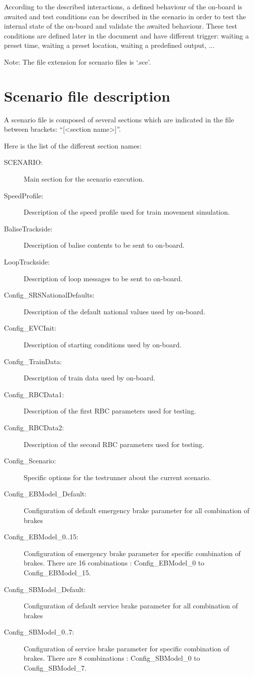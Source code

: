 According to the described interactions, a defined behaviour of the on-board is awaited and test conditions can be described in the scenario in order to test the internal state of the on-board and validate the awaited behaviour. These test conditions are defined later in the document and have different trigger: waiting a preset time, waiting a preset location, waiting a predefined output, ...

Note: The file extension for scenario files is ‘.sce’.

\section{Scenario file description}

A scenario file is composed of several sections which are indicated in the file between brackets: “[<section name>]”.

Here is the list of the different section names:

\begin{description}
	\item[SCENARIO:] Main section for the scenario execution.
	\item[SpeedProfile:] Description of the speed profile used for train movement simulation.
	\item[BaliseTrackside:] Description of balise contents to be sent to on-board.
	\item[LoopTrackside:] Description of loop messages to be sent to on-board.
	\item[Config\_SRSNationalDefaults:] Description of the default national values used by on-board.
	\item[Config\_EVCInit:] Description of starting conditions used by on-board.
	\item[Config\_TrainData:] Description of train data used by on-board.
	\item[Config\_RBCData1:] Description of the first RBC parameters used for testing.
	\item[Config\_RBCData2:] Description of the second RBC parameters used for testing.
	\item[Config\_Scenario:] Specific options for the testrunner about the current scenario.
    \item[Config\_EBModel\_Default:] Configuration of default emergency brake parameter for all combination of brakes
    \item[Config\_EBModel\_0..15:] Configuration of emergency brake parameter for specific combination of brakes. There are 16 combinations : Config\_EBModel\_0 to Config\_EBModel\_15.
    \item[Config\_SBModel\_Default:] Configuration of default service brake parameter for all combination of brakes
    \item[Config\_SBModel\_0..7:] Configuration of service brake parameter for specific combination of brakes. There are 8 combinations : Config\_SBModel\_0 to Config\_SBModel\_7.
\end{description}

